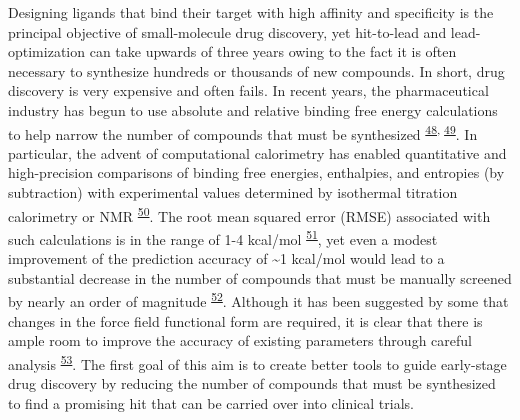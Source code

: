 \documentclass[11pt,notitlepage]{article}
\providecommand{\DIFaddbegin}{} %
\providecommand{\DIFaddend}{} %
\providecommand{\DIFdelbegin}{} %
\providecommand{\DIFdelend}{} %
\newcommand{\DIFscaledelfig}{0.5}
\newlength{\DIFdelgraphicswidth} %
\newlength{\DIFdelgraphicsheight} %
\newcommand{\DIFaddincludegraphics}[2][]{{\color{blue}\fbox{\DIFOincludegraphics[#1]{#2}}}} %
\newcommand{\DIFdelincludegraphics}[2][]{%
\sbox{\DIFdelgraphicsbox}{\DIFOincludegraphics[#1]{#2}}%
\settoboxwidth{\DIFdelgraphicswidth}{\DIFdelgraphicsbox} %
\settoboxtotalheight{\DIFdelgraphicsheight}{\DIFdelgraphicsbox} %
\scalebox{\DIFscaledelfig}{%
\parbox[b]{\DIFdelgraphicswidth}{\usebox{\DIFdelgraphicsbox}\\[-\baselineskip] \rule{\DIFdelgraphicswidth}{0em}}\llap{\resizebox{\DIFdelgraphicswidth}{\DIFdelgraphicsheight}{%
\setlength{\unitlength}{\DIFdelgraphicswidth}%
\begin{picture}(1,1)%
\thicklines\linethickness{2pt} %
{\color[rgb]{1,0,0}\put(0,0){\framebox(1,1){}}}%
{\color[rgb]{1,0,0}\put(0,0){\line( 1,1){1}}}%
{\color[rgb]{1,0,0}\put(0,1){\line(1,-1){1}}}%
\end{picture}%
}\hspace*{3pt}}} %
} %
\DeclareRobustCommand{\DIFaddbegin}{\DIFOaddbegin \let\includegraphics\DIFaddincludegraphics} %
\DeclareRobustCommand{\DIFaddend}{\DIFOaddend \let\includegraphics\DIFOincludegraphics} %
\DeclareRobustCommand{\DIFdelbegin}{\DIFOdelbegin \let\includegraphics\DIFdelincludegraphics} %
\DeclareRobustCommand{\DIFdelend}{\DIFOaddend \let\includegraphics\DIFOincludegraphics} %
\begin{document}
Designing ligands that bind their target with high affinity and
specificity is the principal objective of small-molecule drug discovery,
yet hit-to-lead and lead-optimization can take upwards of three years
owing to the fact it is often necessary to synthesize hundreds or
thousands of new compounds. In short, drug discovery is very expensive
and often fails. In recent years, the pharmaceutical industry has begun
to use absolute and relative binding free energy calculations to help
narrow the number of compounds that must be
synthesized\textsuperscript{\protect\DIFdelbegin %
\DIFdelend \DIFaddbegin \hyperlink{ref-1FiDpP1LR}{48}\DIFaddend ,\protect\DIFdelbegin %
\DIFdelend \DIFaddbegin \hyperlink{ref-1BwXH3GFO}{49}\DIFaddend }.
In particular, the advent of computational calorimetry has enabled
quantitative and high-precision comparisons of binding free energies,
enthalpies, and entropies (by subtraction) with experimental values
determined by isothermal titration calorimetry or
NMR\textsuperscript{\protect\DIFdelbegin %
\DIFdelend \DIFaddbegin \hyperlink{ref-1935a9V0d}{50}\DIFaddend }. The root
mean squared error (RMSE) associated with such calculations is in the
range of 1-4
kcal/mol\textsuperscript{\protect\DIFdelbegin %
\DIFdelend \DIFaddbegin \hyperlink{ref-LWd10vQy}{51}\DIFaddend }, yet even
a modest improvement of the prediction accuracy of \textasciitilde{}1
kcal/mol would lead to a substantial decrease in the number of compounds
that must be manually screened by nearly an order of
magnitude\textsuperscript{\protect\DIFdelbegin %
\DIFdelend \DIFaddbegin \hyperlink{ref-fC0t6Cy1}{52}\DIFaddend }.
Although it has been suggested by some that changes in the force field
functional form are required, it is clear that there is ample room to
improve the accuracy of existing parameters through careful
analysis\textsuperscript{\protect\DIFdelbegin %
\DIFdelend \DIFaddbegin \hyperlink{ref-LOjcxYqt}{53}\DIFaddend }. The
first goal of this aim is to create better tools to guide early-stage
drug discovery by reducing the number of compounds that must be
synthesized to find a promising hit that can be carried over into
clinical trials.
\end{document}
